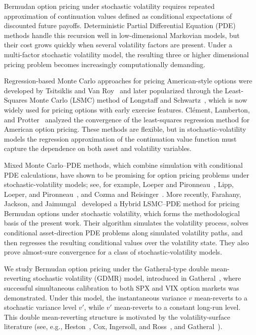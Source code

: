 \documentclass[pdflatex,sn-mathphys-num]{sn-jnl}
\theoremstyle{thmstyleone}%
\theoremstyle{thmstylethree}%
\theoremstyle{thmstyletwo}%
\begin{document}
Bermudan option pricing under stochastic volatility requires repeated
approximation of continuation values defined as conditional expectations of discounted future payoffs. Deterministic Partial Differential Equation (PDE) methods handle this recursion well in low-dimensional Markovian models, but their cost grows quickly when several
volatility factors are present. Under a multi-factor stochastic volatility model, the resulting three or higher dimensional pricing problem becomes increasingly computationally demanding.

Regression-based Monte Carlo approaches for pricing American-style options were developed by Tsitsiklis and Van Roy~\cite{tsitsiklis2001regression} and later popularized through the Least-Squares Monte Carlo (LSMC) method of Longstaff and Schwartz~\cite{longstaff2001valuing}, which is now widely used for pricing options with early exercise features.
Clément, Lamberton, and Protter~\cite{clement2002analysis} analyzed the
convergence of the least-squares regression method for American option pricing.
These methods are flexible, but in stochastic-volatility models the regression approximation of the continuation value function must capture the dependence on both asset and
volatility variables.

Mixed Monte Carlo--PDE methods, which combine simulation with conditional PDE calculations, have shown to be promising for option pricing problems under stochastic-volatility models; see, for example, Loeper and Pironneau~\cite{loeper2009mixed}, Lipp, Loeper, and Pironneau~\cite{lipp2013mixing}, and Cozma and Reisinger~\cite{cozma2017mixed}. More recently, Farahany, Jackson, and Jaimungal~\cite{farahany2020mixing} developed a Hybrid LSMC--PDE method for pricing Bermudan options under stochastic volatility, which forms the methodological basis of the present work. 
Their algorithm simulates the volatility process, solves conditional
asset-direction PDE problems along simulated volatility paths, and then
regresses the resulting conditional values over the volatility state. They also
prove almost-sure convergence for a class of stochastic-volatility models.

We study Bermudan option pricing under the Gatheral-type double mean-reverting stochastic volatility (GDMR) model, introduced in Gatheral~\cite{gatheral2008}, where successful simultaneous calibration to both SPX and VIX option markets was demonstrated. Under this model, the instantaneous variance $v$ mean-reverts to a stochastic variance level $v'$, while $v'$ mean-reverts to a constant long-run level. This double mean-reverting structure is motivated by the
volatility-surface literature (see, e.g., Heston~\cite{heston1993closedform}, Cox, Ingersoll,
and Ross~\cite{cir1985termstructure}, and Gatheral~\cite{gatheral2006volsurface}). 
\end{document}
